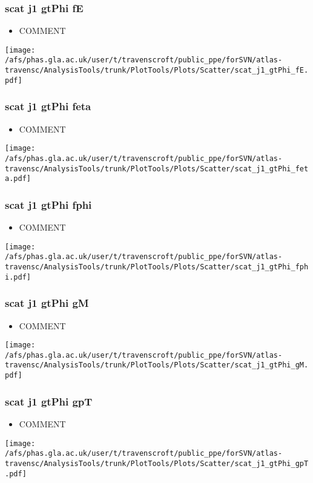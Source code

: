 \documentclass{beamer}
\begin{document}
\begin{frame}
\frametitle{scat j1 gtPhi fE}
\begin{itemize}
\item COMMENT
\end{itemize}
\begin{center}
\texttt{[image: /afs/phas.gla.ac.uk/user/t/travenscroft/public\_ppe/forSVN/atlas-travensc/AnalysisTools/trunk/PlotTools/Plots/Scatter/scat\_j1\_gtPhi\_fE.pdf]}
\end{center}
\end{frame}

\begin{frame}
\frametitle{scat j1 gtPhi feta}
\begin{itemize}
\item COMMENT
\end{itemize}
\begin{center}
\texttt{[image: /afs/phas.gla.ac.uk/user/t/travenscroft/public\_ppe/forSVN/atlas-travensc/AnalysisTools/trunk/PlotTools/Plots/Scatter/scat\_j1\_gtPhi\_feta.pdf]}
\end{center}
\end{frame}

\begin{frame}
\frametitle{scat j1 gtPhi fphi}
\begin{itemize}
\item COMMENT
\end{itemize}
\begin{center}
\texttt{[image: /afs/phas.gla.ac.uk/user/t/travenscroft/public\_ppe/forSVN/atlas-travensc/AnalysisTools/trunk/PlotTools/Plots/Scatter/scat\_j1\_gtPhi\_fphi.pdf]}
\end{center}
\end{frame}

\begin{frame}
\frametitle{scat j1 gtPhi gM}
\begin{itemize}
\item COMMENT
\end{itemize}
\begin{center}
\texttt{[image: /afs/phas.gla.ac.uk/user/t/travenscroft/public\_ppe/forSVN/atlas-travensc/AnalysisTools/trunk/PlotTools/Plots/Scatter/scat\_j1\_gtPhi\_gM.pdf]}
\end{center}
\end{frame}

\begin{frame}
\frametitle{scat j1 gtPhi gpT}
\begin{itemize}
\item COMMENT
\end{itemize}
\begin{center}
\texttt{[image: /afs/phas.gla.ac.uk/user/t/travenscroft/public\_ppe/forSVN/atlas-travensc/AnalysisTools/trunk/PlotTools/Plots/Scatter/scat\_j1\_gtPhi\_gpT.pdf]}
\end{center}
\end{frame}
\end{document}
